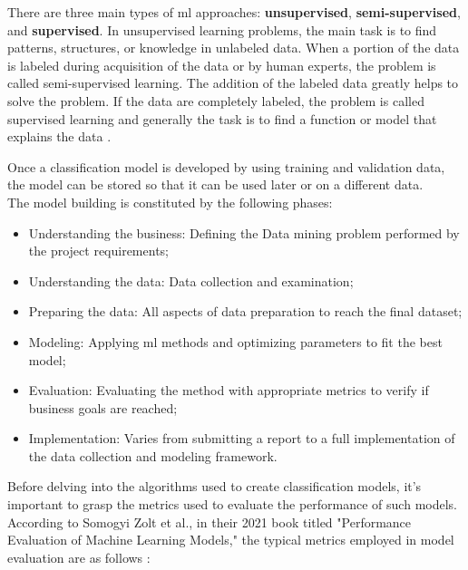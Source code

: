 There are three main types of \gls{ml} approaches: \textbf{unsupervised}, \textbf{semi-supervised}, and \textbf{supervised}. In unsupervised learning problems, the main task is to find patterns, structures, or knowledge in unlabeled data. When a portion of the data is labeled during acquisition of the data or by human experts, the problem is called semi-supervised learning. The addition of the labeled data greatly helps to solve the problem. If the data are completely labeled, the problem is called supervised learning and generally the task is to find a function or model that explains the data \cite{Tom_M_Mitchell1997}.

Once a classification model is developed by using training and validation data, the model can be stored so that it can be used later or on a different data.\\

The model building is constituted by the following phases: 

\begin{itemize}
\item Understanding the business: Defining the Data mining problem performed by the project requirements;
\item  Understanding the data: Data collection and examination;
\item Preparing the data: All aspects of data preparation to reach the final dataset;
\item Modeling: Applying \gls{ml} methods and optimizing parameters to fit the best model;
\item Evaluation: Evaluating the method with appropriate metrics to verify if business goals are reached;
\item  Implementation: Varies from submitting a report to a full implementation of the data collection and modeling framework.
\end{itemize}

Before delving into the algorithms used to create classification models, it's important to grasp the metrics used to evaluate the performance of such models.\\

According to Somogyi Zolt et al., in their 2021 book titled "Performance Evaluation of Machine Learning Models," the typical metrics employed in model evaluation are as follows \cite{Somogyi2021}:

